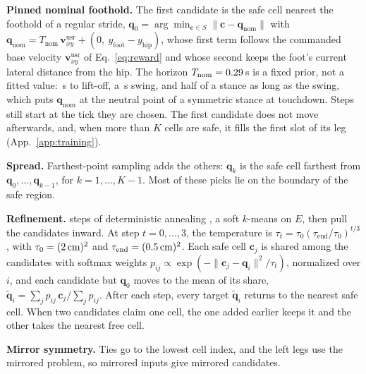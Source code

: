 \noindent\textbf{Pinned nominal foothold.}
 The first candidate is the safe cell nearest the foothold
of a regular stride, $\mathbf q_0 = \arg\min_{\mathbf c \in S} \|\mathbf
c - \mathbf q_{\text{nom}}\|$ with $\mathbf q_{\text{nom}} =
T_{\text{nom}}\, \mathbf v^{\mathrm{usr}}_{xy} + (0,\ y_{\text{foot}} -
y_{\text{hip}})$, whose first term follows the commanded base velocity
$\mathbf v^{\mathrm{usr}}_{xy}$ of Eq.~\eqref{eq:reward} and whose
second keeps the foot's current lateral distance from the hip. The
horizon $T_{\text{nom}} = 0.29$\,s is a fixed prior, not a
fitted value: \corlNomLiftS\,s to lift-off, a \corlNomSwingS\,s swing,
and half of a stance as long as the swing, which puts $\mathbf
q_{\text{nom}}$ at the neutral point of a symmetric stance at
touchdown. Steps still start at the tick they are chosen. The first
candidate does not move afterwards, and, when more than $K$ cells are
safe, it fills the first slot of its leg (App.~\ref{app:training}).

\noindent\textbf{Spread.}
 Farthest-point sampling
\citep{gonzalez_clustering_1985} adds the others: $\mathbf q_k$ is the
safe cell farthest from $\mathbf q_0, \dots, \mathbf q_{k-1}$, for $k =
1, \dots, K-1$. Most of these picks lie on the boundary of the safe
region.

\noindent\textbf{Refinement.}
 \Numberstringnum{\corlAnnealSteps} steps of deterministic annealing
\citep{rose_deterministic_1998}, a soft $k$-means on $E$, then pull the
candidates inward. At step $t = 0, \dots, 3$, the temperature is
$\tau_t = \tau_0 (\tau_{\text{end}} / \tau_0)^{t/3}$, with $\tau_0 =
(2\,\text{cm})^2$ and $\tau_{\text{end}} =
(0.5\,\text{cm})^2$. Each safe cell $\mathbf c_j$ is
shared among the candidates with softmax weights $p_{ij} \propto
\exp(-\|\mathbf c_j - \mathbf q_i\|^2 / \tau_t)$, normalized over $i$,
and each candidate but $\mathbf q_0$ moves to the mean of its share,
$\tilde{\mathbf q}_i = \sum_j p_{ij}\, \mathbf c_j / \sum_j p_{ij}$.
After each step, every target $\tilde{\mathbf q}_i$ returns to the
nearest safe cell. When two candidates claim one cell, the one added
earlier keeps it and the other takes the nearest free cell.

\noindent\textbf{Mirror symmetry.}
 Ties go to the lowest cell index, and the left legs use
the mirrored problem, so mirrored inputs give mirrored candidates.
